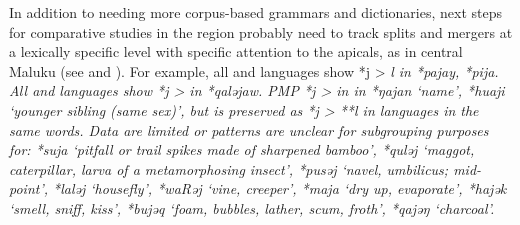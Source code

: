 In addition to needing more corpus-based grammars
and dictionaries, next steps for comparative studies in the region
probably need to track splits
and mergers at a lexically specific level with specific attention
to the apicals, as in central Maluku (see  and ).
For example, all 
and  languages show *j > \it{l} in *pajay, *pija.
All  and  languages show *j > {\0} in *qaləjaw.
PMP *j > {\0} in  in *ŋajan ‘name’,
*huaji ‘younger sibling (same sex)’,
but is preserved as *j > **l in  languages in the same words.
Data are limited or patterns are unclear for subgrouping purposes
for: *suja ‘pitfall or trail spikes made of sharpened bamboo’,
*quləj ‘maggot, caterpillar, larva of a metamorphosing insect’,
*pusəj ‘navel, umbilicus; mid-point’,
*laləj ‘housefly’, *waRəj ‘vine,
creeper’, *maja ‘dry up, evaporate’,
*hajək ‘smell, sniff, kiss’, *bujəq ‘foam, bubbles,
lather, scum, froth’, *qajəŋ ‘charcoal’.